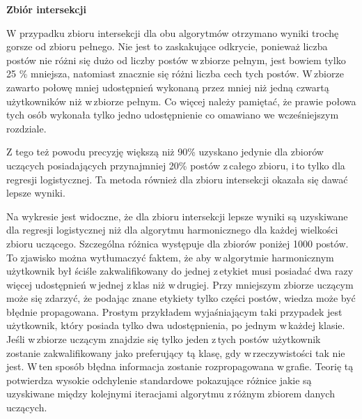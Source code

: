\newpage
\par
\textbf{Zbiór intersekcji} 
\par
W przypadku zbioru intersekcji dla obu algorytmów otrzymano wyniki trochę gorsze od zbioru pełnego. Nie jest to zaskakujące odkrycie, ponieważ liczba postów nie różni się dużo od liczby postów w\,zbiorze pełnym, jest bowiem tylko 25 \% mniejsza, natomiast znacznie się różni liczba cech tych postów. W\,zbiorze zawarto połowę mniej udostępnień wykonaną przez mniej niż jedną czwartą użytkowników niż w\,zbiorze pełnym. Co więcej należy pamiętać, że prawie połowa tych osób wykonała tylko jedno udostępnienie co omawiano we wcześniejszym rozdziale. 
\par
Z tego też powodu precyzję większą niż 90\% uzyskano jedynie dla zbiorów uczących posiadających przynajmniej 20\% postów z\,całego zbioru, i\,to tylko dla regresji logistycznej. Ta metoda również dla zbioru intersekcji okazała się dawać lepsze wyniki. 
\par
Na wykresie jest widoczne, że dla zbioru intersekcji lepsze wyniki są uzyskiwane dla regresji logistycznej niż dla algorytmu harmonicznego dla każdej wielkości zbioru uczącego. Szczególna różnica występuje dla zbiorów poniżej 1000 postów. To zjawisko można wytłumaczyć faktem, że aby w\,algorytmie harmonicznym użytkownik był ściśle zakwalifikowany do jednej z\,etykiet musi posiadać dwa razy więcej udostępnień w\,jednej z\,klas niż w\,drugiej. Przy mniejszym zbiorze uczącym może się zdarzyć, że podając znane etykiety tylko części postów, wiedza może być błędnie propagowana. Prostym przykładem wyjaśniającym taki przypadek jest użytkownik, który posiada tylko dwa udostępnienia, po jednym w\,każdej klasie. Jeśli w\,zbiorze uczącym znajdzie się tylko jeden z\,tych postów użytkownik zostanie zakwalifikowany jako preferujący tą klasę, gdy w\,rzeczywistości tak nie jest. W\,ten sposób błędna informacja zostanie rozpropagowana w\,grafie. Teorię tą potwierdza wysokie odchylenie standardowe pokazujące różnice jakie są uzyskiwane między kolejnymi iteracjami algorytmu z\,różnym zbiorem danych uczących. 


